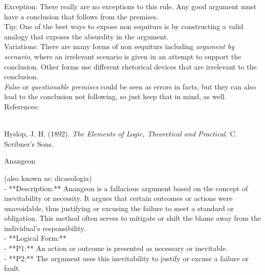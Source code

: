 \documentclass[a4paper,12pt,single,pdftex]{scrartcl}
\begin{document}
{    
      Exception: There really are no exceptions to this rule. Any good argument must have a conclusion that follows from the premises.
    \\

    
      Tip: One of the best ways to expose non sequiturs is by constructing a valid analogy that exposes the absurdity in the argument.
    \\

    
      Variations: There are many forms of non sequiturs including {\it argument by scenario}, where an irrelevant scenario is given in an attempt to support the conclusion.  Other forms use different rhetorical devices that are irrelevant to the conclusion.
    \\

    
      {\it False} or {\it questionable premises} could be seen as errors in facts, but they can also lead to the conclusion not following, so just keep that in mind, as well.
    \\

    References:

    
      
        
      \\

      
        
          Hyslop, J. H. (1892). {\it The Elements of Logic, Theoretical and Practical}. C. Scribner’s Sons.
        
      
    
  }


Anangeon
    
      (also known as: dicaeologia)
    \\

  
    
      - **Description:** Anangeon is a fallacious argument based on the concept of inevitability or necessity. It argues that certain outcomes or actions were unavoidable, thus justifying or excusing the failure to meet a standard or obligation. This method often serves to mitigate or shift the blame away from the individual’s responsibility.
    \\

    
      - **Logical Form:**
    \\

    
        - **P1:** An action or outcome is presented as necessary or inevitable.
    \\

    
        - **P2:** The argument uses this inevitability to justify or excuse a failure or fault.
    \\
\end{document}
